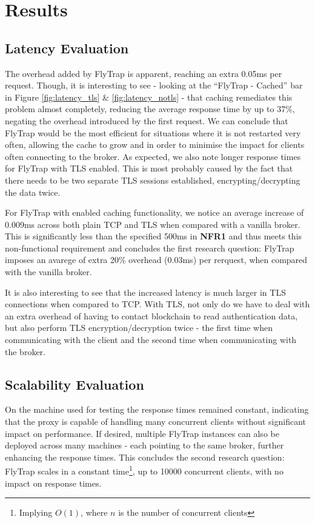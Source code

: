 \section{Results}
\subsection{Latency Evaluation}
The overhead added by FlyTrap is apparent, reaching an extra 0.05ms per request. Though, it is interesting to see - looking at the ``FlyTrap - Cached'' bar in Figure \ref{fig:latency_tls} \& \ref{fig:latency_notls} - that caching remediates this problem almost completely, reducing the average response time by up to 37\%, negating the overhead introduced by the first request. We can conclude that FlyTrap would be the most efficient for situations where it is not restarted very often, allowing the cache to grow and in order to minimise the impact for clients often connecting to the broker. As expected, we also note longer response times for FlyTrap with TLS enabled. This is most probably caused by the fact that there needs to be two separate TLS sessions established, encrypting/decrypting the data twice.

For FlyTrap with enabled caching functionality, we notice an average increase of 0.009ms across both plain TCP and TLS when compared with a vanilla broker. This is significantly less than the specified 500ms in \textbf{NFR1} and thus meets this non-functional requirement and concludes the first research question: FlyTrap imposes an avarege of extra 20\% overhead (0.03ms) per rerquest, when compared with the vanilla broker.

It is also interesting to see that the increased latency is much larger in TLS connections when compared to TCP. With TLS, not only do we have to deal with an extra overhead of having to contact blockchain to read authentication data, but also perform TLS encryption/decryption twice - the first time when communicating with the client and the second time when communicating with the broker.
\subsection{Scalability Evaluation}
On the machine used for testing the response times remained constant, indicating that the proxy is capable of handling many concurrent clients without significant impact on performance. If desired, multiple FlyTrap instances can also be deployed across many machines - each pointing to the same broker, further enhancing the response times. This concludes the second research question: FlyTrap scales in a constant time\footnote{Implying $O(1)$, where $n$ is the number of concurrent clients}, up to 10000 concurrent clients, with no impact on response times.


